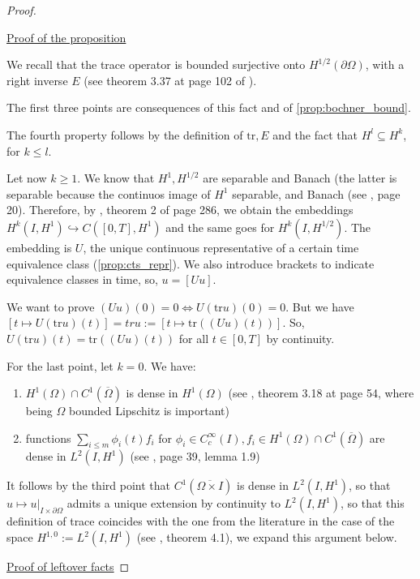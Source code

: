 \documentclass[english,a4paper,12pt,oneside]{scrbook}
\theoremstyle{break}
\newenvironment{mproof}[1][\proofname]{%
  \begin{proof}[#1]$ $\par\nobreak\ignorespaces
}{%
  \end{proof}
}
\renewcommand*{\proofname}{Proof}
\theoremstyle{remark}
\newcommand{\tr}{\text{tr}}
\newcommand{\emb}{\hookrightarrow}
\begin{document}
\begin{mproof}

\underline{Proof of the proposition}

We recall that the trace operator is bounded surjective onto $H^{1/2}(\partial \Omega)$, with a right inverse $E$ (see theorem 3.37 at page 102 of \cite{mclean}).

The first three points are consequences of this fact and of \cref{prop:bochner_bound}.

The fourth property follows by the definition of $\tr, E$ and the fact that $H^l\subseteq H^k$, for $k\leq l$.

Let now $k\geq 1$. We know that $H^1, H^{1/2}$ are separable and Banach (the latter is separable because the continuos image of $H^1$ separable, and Banach (see \cite{grisvard}, page 20). Therefore, by \cite{evans}, theorem 2 of page 286, we obtain the embeddings $H^k(I,H^1)\emb C([0,T],H^1)$ and the same goes for $H^k(I,H^{1/2})$. The embedding is $U$, the unique continuous representative of a certain time equivalence class (\cref{prop:cts_repr}). We also introduce brackets to indicate equivalence classes in time, so, $u = [Uu]$.

We want to prove $(Uu)(0)=0 \iff U(\tr u)(0)=0$. But we have $[t \mapsto U(\tr u )(t)]=tru:=[t \mapsto \tr((Uu)(t))]$. So, $U(\tr u )(t)=\tr((Uu)(t))$ for all $t\in[0,T]$ by continuity. 

For the last point, let $k=0$. We have:

\begin{enumerate}
\item $H^1(\Omega)\cap C^1(\overline{\Omega})$ is dense in $H^1(\Omega)$ (see \cite{adams}, theorem 3.18 at page 54, where being $\Omega$ bounded Lipschitz is important)
\item functions $\sum_{i\leq m} \phi_i(t)f_i$ for $\phi_i \in C_c^\infty(I), f_i \in H^1(\Omega)\cap C^1(\overline{\Omega})$ are dense in $L^2(I,H^1)$ (see \cite{hinze}, page 39, lemma 1.9)
\end{enumerate}

It follows by the third point that $C^1(\overline{\Omega\times I})$ is dense in $L^2(I,H^1)$, so that $u\mapsto u|_{I\times \partial \Omega}$ admits a unique extension by continuity to $L^2(I,H^1)$, so that this definition of trace coincides with the one from the literature in the case of the space $H^{1,0}:=L^2(I,H^1)$ (see \cite{lions}, theorem 4.1), we expand this argument below.

\underline{Proof of leftover facts}


\end{mproof}
\end{document}
